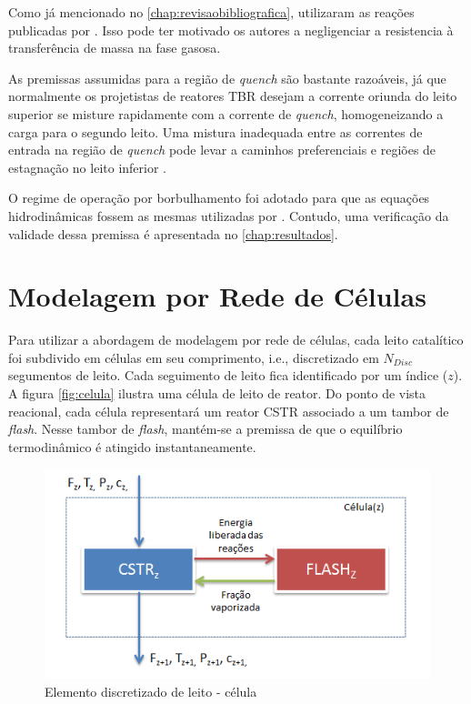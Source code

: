 Como já mencionado no \autoref{chap:revisaobibliografica},
 utilizaram as reações publicadas por
. Isso pode ter motivado os autores a negligenciar a
resistencia à transferência de massa na fase gasosa.

As premissas assumidas para a região de \emph{quench} são bastante razoáveis, já
que normalmente os projetistas de reatores TBR desejam a corrente oriunda do
leito superior se misture rapidamente com a corrente de \emph{quench},
homogeneizando a carga para o segundo leito. Uma mistura inadequada entre as
correntes de entrada na região de \emph{quench} pode levar a caminhos
preferenciais e regiões de estagnação no leito inferior \cite{Ancheyta2011}.

O regime de operação por borbulhamento foi adotado para que as
equações hidrodinâmicas fossem as mesmas utilizadas por .
Contudo, uma verificação da validade dessa premissa é apresentada no
\autoref{chap:resultados}.

\section{Modelagem por Rede de Células} \label{sec:modelagemredecelulas}

Para utilizar a abordagem de modelagem por rede de células, cada leito
catalítico foi subdivido em células em seu comprimento, i.e., discretizado em
$N_{Disc}$ segumentos de leito. Cada seguimento de leito fica identificado por
um índice ($z$). A figura \autoref{fig:celula} ilustra uma célula de leito de
reator. Do ponto de vista reacional, cada célula representará um reator CSTR
associado a um tambor de \emph{flash}. Nesse tambor de \emph{flash}, mantém-se a premissa
de que o equilíbrio termodinâmico é atingido instantaneamente.

 \begin{figure}[htb]
 \centering \includegraphics[scale=0.75]{images/Chap3/celula.png}
 \caption{Elemento discretizado de leito - célula}
 \label{fig:celula}
 \end{figure}

